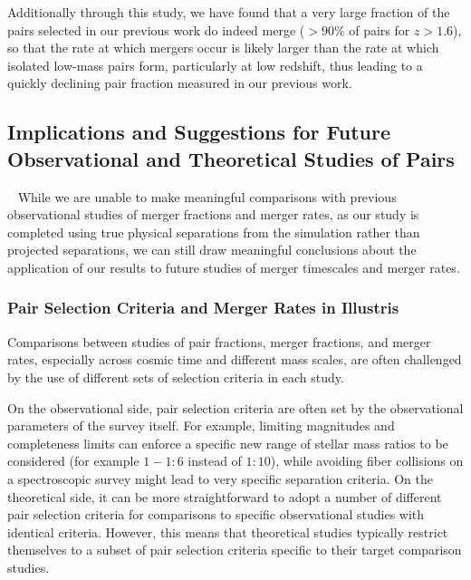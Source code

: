 \documentclass[twocolumn,linenumbers]{aastex631}
\begin{document}
        Additionally through this study, we have found that a very large fraction of the pairs selected in our previous work do indeed merge ($>90\%$ of pairs for $z>1.6$), so that the rate at which mergers occur is likely larger than the rate at which isolated low-mass pairs form, particularly at low redshift, thus leading to a quickly declining pair fraction measured in our previous work. 

        
    \subsection{Implications and Suggestions for Future Observational and Theoretical Studies of Pairs}~\label{sec:disc-suggestions}
        While we are unable to make meaningful comparisons with previous observational studies of merger fractions and merger rates, as our study is completed using true physical separations from the simulation rather than projected separations, we can still draw meaningful conclusions about the application of our results to future studies of merger timescales and merger rates. 
    
        \subsubsection{Pair Selection Criteria and Merger Rates in Illustris}
            Comparisons between studies of pair fractions, merger fractions, and merger rates, especially across cosmic time and different mass scales, are often challenged by the use of different sets of selection criteria in each study.
            
            On the observational side, pair selection criteria are often set by the observational parameters of the survey itself. 
            For example, limiting magnitudes and completeness limits can enforce a specific new range of stellar mass ratios to be considered (for example $1-1:6$ instead of $1:10$), while avoiding fiber collisions on a spectroscopic survey might lead to very specific separation criteria.
            On the theoretical side, it can be more straightforward to adopt a number of different pair selection criteria for comparisons to specific observational studies with identical criteria. 
            However, this means that theoretical studies typically restrict themselves to a subset of pair selection criteria specific to their target comparison studies.
    
\end{document}
